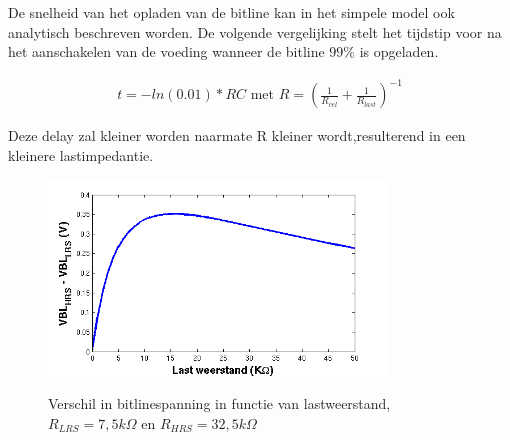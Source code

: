 De snelheid van het opladen van de bitline kan in het simpele model ook analytisch beschreven worden. De volgende vergelijking stelt het tijdstip voor na het aanschakelen van de voeding wanneer de bitline $99\%$ is opgeladen.

\begin{align}
t = -ln(0.01)*RC \text{ met } R = (\frac{1}{R_{cel}} + \frac{1}{R_{last}})^{-1}
\end{align}

Deze delay zal kleiner worden naarmate R kleiner wordt,resulterend in een kleinere lastimpedantie.

\begin{figure}[!ht]
\centering
 \includegraphics[width=0.80\textwidth] {../fig/hfdst-last-rpiek.png} \label{fig:rpiek}
\caption[Verschil in bitlinespanning in functie van lastweerstand]{Verschil in bitlinespanning in functie van lastweerstand, $R_{LRS}=7,5 k \Omega$ en $R_{HRS}= 32,5 k \Omega$}
\end{figure}




